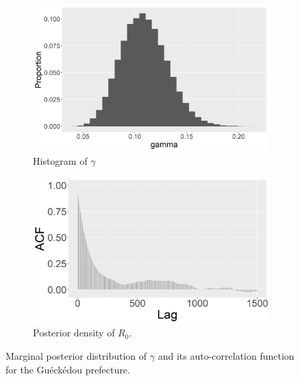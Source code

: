 \documentclass[11pt]{article}
\begin{document}
	\begin{figure}
		\centering
		\begin{subfigure}[b]{0.45\textwidth}
			\centering
			\includegraphics[width=\textwidth]{E5_gamma_hist}
			\caption{Histogram of $\gamma$}
			\label{fig:E5_gamma_hist}
		\end{subfigure}
		\hfill
		\begin{subfigure}[b]{0.49\textwidth}
			\centering
			\includegraphics[width=\textwidth]{E5_gamma_acf}
			\caption{Posterior density of $R_0$.}
			\label{fig:density_R0}
		\end{subfigure}
		\caption{Marginal posterior distribution of $\gamma$ and its auto-correlation function for the Gu\'eck\'edou prefecture.}
		\label{fig:ebola}
	\end{figure}
	
\end{document}
